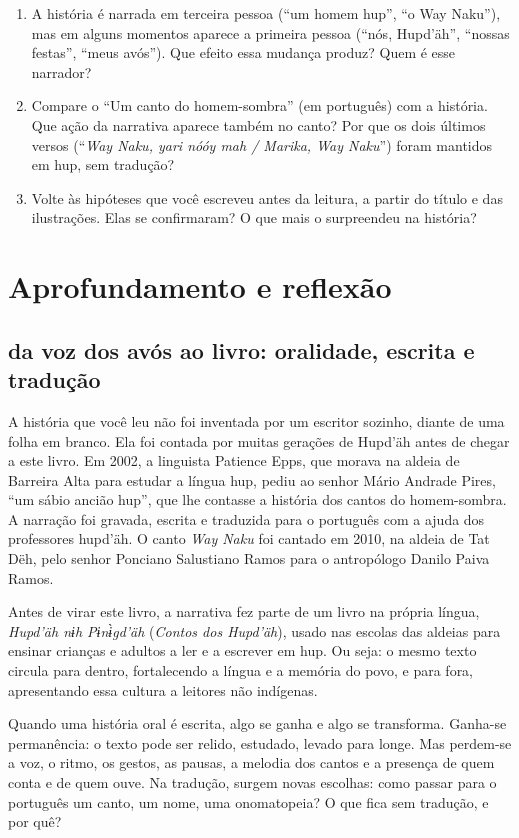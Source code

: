 \begin{enumerate}[label=\arabic*.]
\item A história é narrada em terceira pessoa (``um homem hup'', ``o Way
Naku''), mas em alguns momentos aparece a primeira pessoa (``nós,
Hupd'äh'', ``nossas festas'', ``meus avós''). Que efeito essa mudança
produz? Quem é esse narrador?

\item Compare o ``Um canto do homem-sombra'' (em português) com a
história. Que ação da narrativa aparece também no canto? Por que os dois
últimos versos (``\textit{Way Naku, yari nóóy mah / Marika, Way
Naku}'') foram mantidos em hup, sem tradução?

\item Volte às hipóteses que você escreveu antes da leitura, a partir do
título e das ilustrações. Elas se confirmaram? O que mais o surpreendeu
na história?
\end{enumerate}

\chapter{Aprofundamento e reflexão}

\section{da voz dos avós ao livro: oralidade, escrita e tradução}

A história que você leu não foi inventada por um escritor sozinho,
diante de uma folha em branco. Ela foi contada por muitas gerações de
Hupd'äh antes de chegar a este livro. Em 2002, a linguista Patience Epps,
que morava na aldeia de Barreira Alta para estudar a língua hup, pediu
ao senhor Mário Andrade Pires, ``um sábio ancião hup'', que lhe contasse
a história dos cantos do homem-sombra. A narração foi gravada, escrita
e traduzida para o português com a ajuda dos professores hupd'äh. O
canto \textit{Way Naku} foi cantado em 2010, na aldeia de Tat Dëh, pelo
senhor Ponciano Salustiano Ramos para o antropólogo Danilo Paiva Ramos.

Antes de virar este livro, a narrativa fez parte de um livro na própria
língua, \textit{Hupd’äh nɨh Pɨnɨ̀gd’äh} (\textit{Contos dos Hupd'äh}),
usado nas escolas das aldeias para ensinar crianças e adultos a ler e a
escrever em hup. Ou seja: o mesmo texto circula para dentro, fortalecendo
a língua e a memória do povo, e para fora, apresentando essa cultura a
leitores não indígenas.

Quando uma história oral é escrita, algo se ganha e algo se transforma.
Ganha-se permanência: o texto pode ser relido, estudado, levado para
longe. Mas perdem-se a voz, o ritmo, os gestos, as pausas, a melodia dos
cantos e a presença de quem conta e de quem ouve. Na tradução, surgem
novas escolhas: como passar para o português um canto, um nome, uma
onomatopeia? O que fica sem tradução, e por quê?

